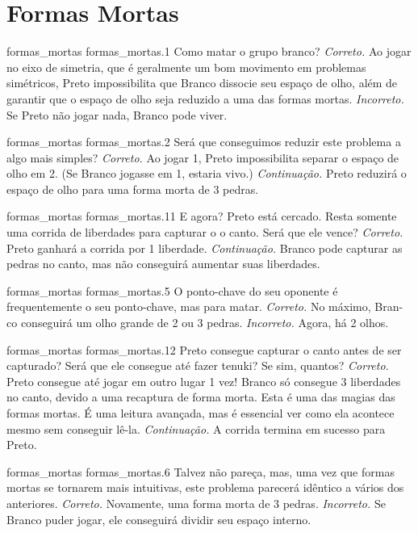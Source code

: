\chapter{Formas Mortas}

\emptypage

\problemAnswerDiagram
  {formas_mortas}
  {formas_mortas.1}
  {Como matar o grupo branco?}
  {\emph{Correto.} Ao jogar no eixo de simetria, que é geralmente um bom movimento em problemas simétricos, Preto impossibilita que Branco dissocie seu espaço de olho, além de garantir que o espaço de olho seja reduzido a uma das formas mortas.}
  {\emph{Incorreto.} Se Preto não jogar nada, Branco pode viver.}

\problemAnswerDiagram
  {formas_mortas}
  {formas_mortas.2}
  {Será que conseguimos reduzir este problema a algo mais simples?}
  {\emph{Correto.} Ao jogar 1, Preto impossibilita separar o espaço de olho em 2. (Se Branco jogasse em 1, estaria vivo.)}
  {\emph{Continuação.} Preto reduzirá o espaço de olho para uma forma morta de 3 pedras.}

\problemAnswerDiagram
  {formas_mortas}
  {formas_mortas.11}
  {E agora? Preto está cercado. Resta somente uma corrida de liberdades para capturar o o canto. Será que ele vence?}
  {\emph{Correto.} Preto ganhará a corrida por 1 liberdade.}
  {\emph{Continuação.} Branco pode capturar as pedras no canto, mas não conseguirá aumentar suas liberdades.}

\problemAnswerDiagram
  {formas_mortas}
  {formas_mortas.5}
  {O ponto-chave do seu oponente é frequentemente o seu ponto-chave, mas para matar.}
  {\emph{Correto.} No máximo, Bran-co conseguirá um olho grande de 2 ou 3 pedras.}
  {\emph{Incorreto.} Agora, há 2 olhos.}

\problemAnswerDiagram
  {formas_mortas}
  {formas_mortas.12}
  {Preto consegue capturar o canto antes de ser capturado? Será que ele consegue até fazer tenuki? Se sim, quantos?}
  {\emph{Correto.} Preto consegue até jogar em outro lugar 1 vez! Branco só consegue 3 liberdades no canto, devido a uma recaptura de forma morta. Esta é uma das magias das formas mortas. É uma leitura avançada, mas é essencial ver como ela acontece mesmo sem conseguir lê-la.}
  {\emph{Continuação.} A corrida termina em sucesso para Preto.}

\problemAnswerDiagram
  {formas_mortas}
  {formas_mortas.6}
  {Talvez não pareça, mas, uma vez que formas mortas se tornarem mais intuitivas, este problema parecerá idêntico a vários dos anteriores.}
  {\emph{Correto.} Novamente, uma forma morta de 3 pedras.}
  {\emph{Incorreto.} Se Branco puder jogar, ele conseguirá dividir seu espaço interno.}

